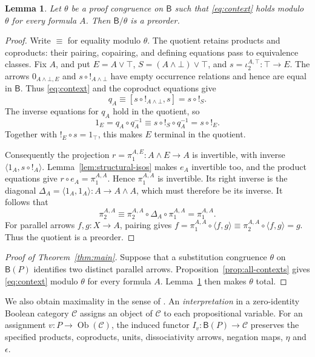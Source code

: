 \documentclass[11pt]{article}
\newtheorem{lemma}[theorem]{Lemma}
\newcommand{\B}{\mathsf B}
\begin{document}
\begin{lemma}\label{lem:collapse}
Let $\theta$ be a proof congruence on $\B$ such that
\eqref{eq:context} holds modulo $\theta$ for every formula $A$.
Then $\B/\theta$ is a preorder.
\end{lemma}

\begin{proof}
Write $\equiv$ for equality modulo $\theta$.
The quotient retains products and coproducts: their pairing,
copairing, and defining equations pass to equivalence classes.
Fix $A$, and put
$E=A\vee\top$, $S=(A\wedge\bot)\vee\top$, and
$s=\iota_2^{A,\top}:\top\to E$.
The arrows $0_{A\wedge\bot,E}$ and $s\circ!_{A\wedge\bot}$ have
empty occurrence relations and hence are equal in $\B$. Thus
\eqref{eq:context} and the coproduct equations give
\[
 q_A\equiv[s\circ!_{A\wedge\bot},s]=s\circ!_S.
\]
The inverse equations for $q_A$ hold in the quotient, so
\[
 1_E=q_A\circ q_A^{-1}
    \equiv s\circ!_S\circ q_A^{-1}=s\circ!_E.
\]
Together with $!_E\circ s=1_\top$, this makes $E$ terminal in the
quotient.

Consequently the projection
$r=\pi_1^{A,E}:A\wedge E\to A$ is invertible, with inverse
$\langle1_A,s\circ!_A\rangle$.
Lemma~\ref{lem:structural-isos} makes $e_A$ invertible too, and the
product equations give
$r\circ e_A=\pi_1^{A,A}$.
Hence $\pi_1^{A,A}$ is invertible. Its right inverse is the diagonal
$\Delta_A=\langle1_A,1_A\rangle:A\to A\wedge A$, which must
therefore be its inverse. It follows that
\[
 \pi_2^{A,A}
   \equiv\pi_2^{A,A}\circ\Delta_A\circ\pi_1^{A,A}
   =\pi_1^{A,A}.
\]
For parallel arrows $f,g:X\to A$, pairing gives
$f=\pi_1^{A,A}\circ\langle f,g\rangle
 \equiv\pi_2^{A,A}\circ\langle f,g\rangle=g$.
Thus the quotient is a preorder.
\end{proof}

\begin{proof}[Proof of Theorem~\ref{thm:main}]
Suppose that a substitution congruence $\theta$ on $\B(P)$ identifies
two distinct parallel arrows. Proposition~\ref{prop:all-contexts}
gives \eqref{eq:context} modulo $\theta$ for every formula $A$.
Lemma~\ref{lem:collapse} then makes $\theta$ total.
\end{proof}

We also obtain maximality in the sense of
\cite[\S9.3, p.~194]{DP}. An \emph{interpretation} in a zero-identity
Boolean category $\mathcal C$ assigns an object of $\mathcal C$ to
each propositional variable. For an assignment
$v:P\to\operatorname{Ob}(\mathcal C)$, the induced functor
$I_v:\B(P)\to\mathcal C$ preserves the specified products, coproducts,
units, dissociativity arrows, negation maps, $\eta$ and $\epsilon$.
\end{document}
